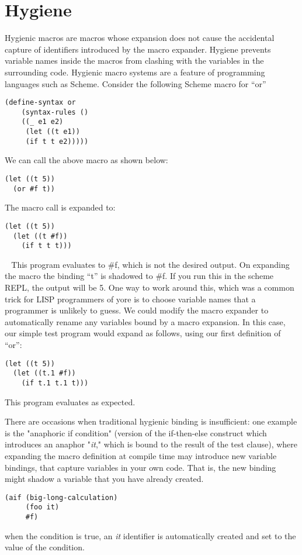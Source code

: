 \section{Hygiene}

Hygienic macros are macros whose expansion does not cause the accidental capture of identifiers introduced by the macro expander. Hygiene prevents variable names inside the macros from clashing with the variables in the surrounding code. Hygienic macro systems are a feature of programming languages such as Scheme. Consider the following Scheme macro for ``or''

\begin{lstlisting}[frame=single]
(define-syntax or
  	(syntax-rules ()
    ((_ e1 e2)
     (let ((t e1))
     (if t t e2)))))
\end{lstlisting}
We can call the above macro as shown below:
\begin{lstlisting}[frame=single]
(let ((t 5))
  (or #f t))
\end{lstlisting} 
The macro call is expanded to:
\begin{lstlisting}[frame=single]
(let ((t 5))
  (let ((t #f))
    (if t t t)))
\end{lstlisting} 
\textcolor{white}{``}
 This program evaluates to \#f, which is not the desired output. On expanding the macro the binding ``t'' is shadowed to \#f. If you run this in the scheme REPL, the output will be 5. One way to work around this, which was a common trick for LISP programmers of yore is to choose variable names that a programmer is unlikely to guess. We could modify the macro expander to automatically rename any variables bound by a macro expansion. In this case, our simple test program would expand as follows, using our first definition of ``or'':
\textcolor{white}{''}
\begin{lstlisting}[frame=single] 
(let ((t 5))
  (let ((t.1 #f))
    (if t.1 t.1 t)))
\end{lstlisting}   
This program evaluates as expected.\textcolor{white}{``}

There are occasions when traditional hygienic binding is insufficient: one example is the "anaphoric if condition" (version of the if-then-else construct which introduces an anaphor "\textit{it}," which is bound to the result of the test clause), where expanding the macro definition at compile time may introduce new variable bindings, that capture variables in your own code. That is, the new binding might shadow a variable that you have already created.
\textcolor{white}{''}
\begin{lstlisting}[frame=single] 
(aif (big-long-calculation)
     (foo it)
     #f)
\end{lstlisting} 
when the condition is true, an  \textit{it} identifier is automatically created and set to the value of the condition.

